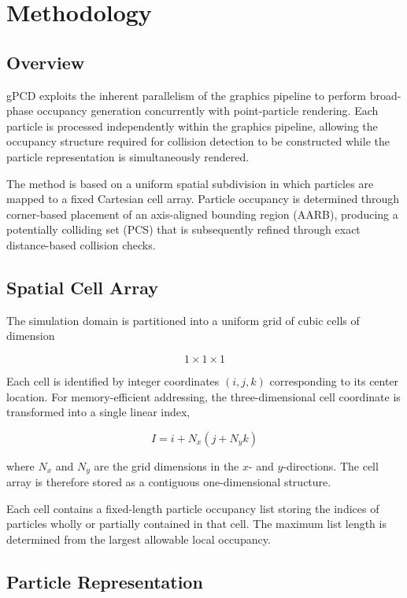 
\section{Methodology}

\subsection{Overview}

gPCD exploits the inherent parallelism of the graphics pipeline to perform broad-phase occupancy generation concurrently with point-particle rendering. Each particle is processed independently within the graphics pipeline, allowing the occupancy structure required for collision detection to be constructed while the particle representation is simultaneously rendered.

The method is based on a uniform spatial subdivision in which particles are mapped to a fixed Cartesian cell array. Particle occupancy is determined through corner-based placement of an axis-aligned bounding region (AARB), producing a potentially colliding set (PCS) that is subsequently refined through exact distance-based collision checks.

\subsection{Spatial Cell Array}

The simulation domain is partitioned into a uniform grid of cubic cells of dimension

\[
1 \times 1 \times 1
\]

Each cell is identified by integer coordinates $(i,j,k)$ corresponding to its center location. For memory-efficient addressing, the three-dimensional cell coordinate is transformed into a single linear index,

\[
I = i + N_x \left(j + N_y k\right)
\]

where $N_x$ and $N_y$ are the grid dimensions in the $x$- and $y$-directions. The cell array is therefore stored as a contiguous one-dimensional structure.

Each cell contains a fixed-length particle occupancy list storing the indices of particles wholly or partially contained in that cell. The maximum list length is determined from the largest allowable local occupancy.

\subsection{Particle Representation}

